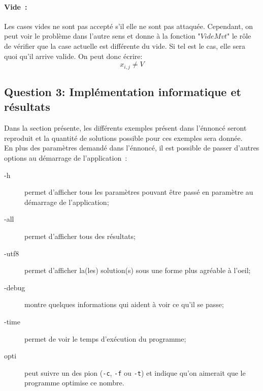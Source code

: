 \documentclass[a4paper,11pt]{article}
\begin{document}
          \paragraph{Vide~:}
            Les cases vides ne sont pas accepté s'il elle ne sont pas attaquée.  Cependant, on peut voir le problème dans l'autre sens et donne à la fonction "$VideMvt$" le rôle de vérifier que la case actuelle est différente du vide.  Si tel est le cas, elle sera quoi qu'il arrive valide.  On peut donc écrire:
            \[x_{i, j} \neq V\]

    \subsection{Question 3: Implémentation informatique et résultats}
        Dans la section présente, les différents exemples présent dans l'énnoncé seront reproduit et la quantité de solutions possible pour ces exemples sera donnée.\\
        En plus des paramètres demandé dans l'énnoncé, il est possible de passer d'autres options au démarrage de l'application~:
        \begin{description}
            \item[-h] permet d'afficher tous les paramètres pouvant être passé en paramètre au démarrage de l'application;
            \item[-all] permet d'afficher tous des résultats;
            \item[-utf8] permet d'afficher la(les) solution(s) sous une forme plus agréable à l'oeil;
            \item[-debug] montre quelques informations qui aident à voir ce qu'il se passe;
            \item[-time] permet de voir le temps d'exécution du programme;
            \item[opti] peut suivre un des pion (\verb|-c|, \verb|-f| ou \verb|-t|) et indique qu'on aimerait que le programme optimise ce nombre.
        \end{description}
        
\end{document}
